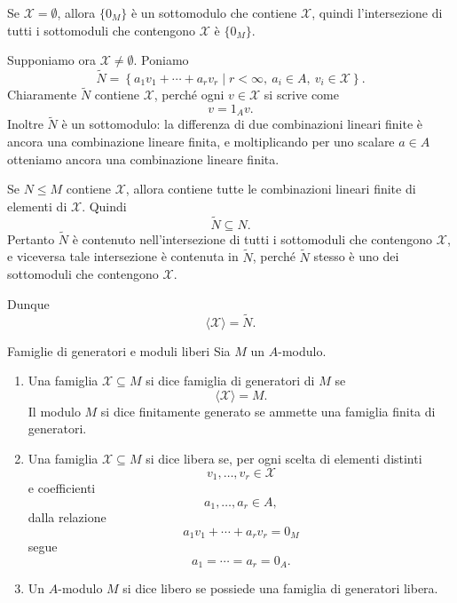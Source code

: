 \documentclass[a4paper]{article}
\begin{document}
\begin{radioactive}
\begin{snippetproof}{}
    Se \(\mathcal{X}=\emptyset\), allora \(\{0_M\}\) è un sottomodulo che contiene \(\mathcal{X}\), quindi l'intersezione di tutti i sottomoduli che contengono \(\mathcal{X}\) è \(\{0_M\}\).

    Supponiamo ora \(\mathcal{X}\neq\emptyset\). Poniamo
    \[
        \widetilde{N}
        =
        \left\{
            a_1v_1+\cdots+a_rv_r
            \mid
            r<\infty,\ a_i\in A,\ v_i\in\mathcal{X}
        \right\}.
    \]
    Chiaramente \(\widetilde{N}\) contiene \(\mathcal{X}\), perché ogni \(v\in\mathcal{X}\) si scrive come
    \[
        v=1_Av.
    \]
    Inoltre \(\widetilde{N}\) è un sottomodulo: la differenza di due combinazioni lineari finite è ancora una combinazione lineare finita, e moltiplicando per uno scalare \(a\in A\) otteniamo ancora una combinazione lineare finita.

    Se \(N\leq M\) contiene \(\mathcal{X}\), allora contiene tutte le combinazioni lineari finite di elementi di \(\mathcal{X}\). Quindi
    \[
        \widetilde{N}\subseteq N.
    \]
    Pertanto \(\widetilde{N}\) è contenuto nell'intersezione di tutti i sottomoduli che contengono \(\mathcal{X}\), e viceversa tale intersezione è contenuta in \(\widetilde{N}\), perché \(\widetilde{N}\) stesso è uno dei sottomoduli che contengono \(\mathcal{X}\).

    Dunque
    \[
        \langle \mathcal{X}\rangle=\widetilde{N}.
    \]
\end{snippetproof}
\end{radioactive}

\begin{radioactive}
\begin{snippetdefinition}{Famiglie di generatori e moduli liberi}
    Sia \(M\) un \(A\)-modulo.

    \begin{enumerate}
        \item Una famiglia \(\mathcal{X}\subseteq M\) si dice famiglia di generatori di \(M\) se
        \[
            \langle \mathcal{X}\rangle=M.
        \]
        Il modulo \(M\) si dice finitamente generato se ammette una famiglia finita di generatori.

        \item Una famiglia \(\mathcal{X}\subseteq M\) si dice libera se, per ogni scelta di elementi distinti
        \[
            v_1,\ldots,v_r\in\mathcal{X}
        \]
        e coefficienti
        \[
            a_1,\ldots,a_r\in A,
        \]
        dalla relazione
        \[
            a_1v_1+\cdots+a_rv_r=0_M
        \]
        segue
        \[
            a_1=\cdots=a_r=0_A.
        \]

        \item Un \(A\)-modulo \(M\) si dice libero se possiede una famiglia di generatori libera.
    \end{enumerate}
\end{snippetdefinition}
\end{radioactive}
\end{document}
